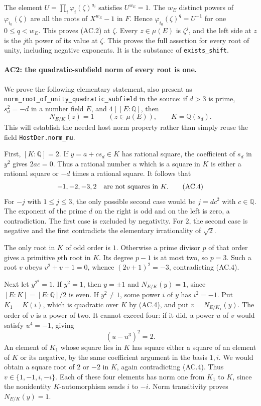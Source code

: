 The element
$U=\prod_i\varphi_i(\zeta)^{a_i}$ satisfies $U^{w_E}=1$.
The $w_E$ distinct powers of $\varphi_{i_0}(\zeta)$ are all the roots
of $X^{w_E}-1$ in $F$. Hence
$\varphi_{i_0}(\zeta)^q=U^{-1}$ for one $0\leq q<w_E$.
This proves (AC.2) at $\zeta$. Every $z\in\mu(E)$ is $\zeta^j$,
and the left side at $z$ is the $j$th power of its value at $\zeta$.
This proves the full assertion for every root of unity, including
negative exponents. It is the substance of \texttt{exists\_shift}.

\paragraph{AC2: the quadratic-subfield norm of every root is one.}
We prove the following elementary statement, also present as
\texttt{norm\_root\_of\_unity\_quadratic\_subfield} in the source:
if $d>3$ is prime, $s_d^2=-d$ in a number field $E$, and
$4\mid[E:\mathbb Q]$, then
\[
                  N_{E/K}(z)=1\qquad(z\in\mu(E)),
            \qquad K=\mathbb Q(s_d).                         \tag{AC.3}
\]
This will establish the needed host norm property rather than simply
reuse the field \texttt{HostDer.norm\_mu}.

First, $[K:\mathbb Q]=2$. If $y=a+c s_d\in K$ has rational square,
the coefficient of $s_d$ in $y^2$ gives $2ac=0$. Thus a rational number
$u$ which is a square in $K$ is either a rational square or $-d$ times
a rational square. It follows that
\[
             -1,-2,-3,2\quad\hbox{are not squares in }K.
                                                               \tag{AC.4}
\]
For $-j$ with $1\leq j\leq3$, the only possible second case would be
$j=d c^2$ with $c\in\mathbb Q$. The exponent of the prime $d$ on the
right is odd and on the left is zero, a contradiction. The first
case is excluded by negativity. For $2$, the second case is negative
and the first contradicts the elementary irrationality of $\sqrt2$.

The only root in $K$ of odd order is $1$. Otherwise a prime divisor
$p$ of that order gives a primitive $p$th root in $K$. Its degree
$p-1$ is at most two, so $p=3$. Such a root $v$ obeys
$v^2+v+1=0$, whence $(2v+1)^2=-3$, contradicting (AC.4).

Next let $y^{2^a}=1$. If $y^2=1$, then $y=\pm1$ and
$N_{E/K}(y)=1$, since $[E:K]=[E:\mathbb Q]/2$ is even.
If $y^2\ne1$, some power $i$ of $y$ has $i^2=-1$.
Put $K_1=K(i)$, which is quadratic over $K$ by (AC.4), and put
$v=N_{E/K_1}(y)$. The order of $v$ is a power of two.
It cannot exceed four: if it did, a power $u$ of $v$ would satisfy
$u^4=-1$, giving
\[
                         (u-u^3)^2=2.
\]
An element of $K_1$ whose square lies in $K$ has square either a
square of an element of $K$ or its negative, by the same coefficient
argument in the basis $1,i$. We would obtain a square root of $2$
or $-2$ in $K$, again contradicting (AC.4).
Thus $v\in\{1,-1,i,-i\}$. Each of these four elements has norm one
from $K_1$ to $K$, since the nonidentity $K$-automorphism sends
$i$ to $-i$. Norm transitivity proves $N_{E/K}(y)=1$.

